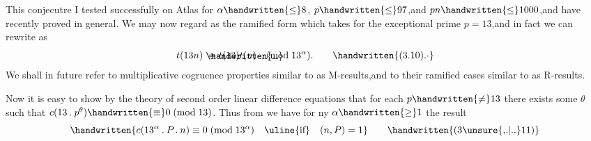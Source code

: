 This conjecutre I tested successfully on Atlas for $\alpha\handwritten{\leq}8$, $p\handwritten{\leq}97$,and $pn\handwritten{\leq}1000$,and have recently proved in general. We may now regard  as the ramified form which  takes for the exceptional prime $p=13$,and in fact we can rewrite  as
\[
t(13n)\mathrel{\rlap{\raisebox{-.12ex}{\handwritten{\rule{.65em}{.55pt}}}}=}t(13)t(n)\quad(\mathrm{mod}\;13^{\alpha}).
\tag*{\handwritten{(3.10).\raisebox{.4ex}{.}}}
\]
We shall in future refer to multiplicative cogruence properties similar to  as M-results,and to their ramified cases similar to  as R-results.

Now it is easy to show by the theory of second order linear difference equations that for each $p\handwritten{\ne}13$ there exists some $\theta$ such that $c(13\mathbin{.}p^{\theta})\handwritten{\equiv}0\;(\mathrm{mod}\;13)$. Thus from  we have for ny $\alpha\handwritten{\geq}1$ the result
\[
\handwritten{c(13^{\alpha}\mathbin{.}P\mathbin{.}n)\equiv0\;(\mathrm{mod}\;13^{\alpha})\quad\text{\uline{if}}\quad(n,P)=1}
\tag*{\handwritten{(3\unsure{,.|..}11)}}
\]

